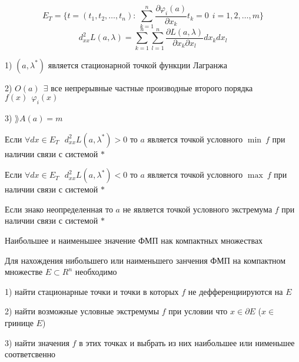 \begin{define}
  $$
  E_T = \{t = (t_1, t_2, \ldots, t_n): ~ \sum_{k=1}^n
  \frac{\partial \varphi_i(a)}{\partial x_k} t_k = 0 ~~ i = 1,2,\ldots,m\}
  $$
  $$
  d_{xx}^2 L(a, \lambda) = \sum_{k=1}^n \sum_{l=1}^n
  \frac{\partial L(a, \lambda)}{\partial x_k \partial x_l} dx_k dx_l
  $$
\end{define}

\begin{block}
  1) $(a, \lambda^*)$ является стационарной точкой функции Лагранжа

  2) $O(a) ~~ \exists$ все непрерывные частные производные второго порядка
  $f(x) ~~ \varphi_i (x)$

  3) $\rang A(a) = m$

  Если $\forall dx \in E_T ~~~ d_{xx}^2 L(a, \lambda^*) > 0$ то $a$ является
  точкой условного $\min ~ f$ при наличии связи с системой $*$

  Если $\forall dx \in E_T ~~~ d_{xx}^2 L(a, \lambda^*) < 0$ то $a$ является
  точкой условного $\max ~ f$ при наличии связи с системой $*$

  Если знако неопределенная то $a$ не является точкой условного экстремума
  $f$ при наличии связи с системой $*$
\end{block}

\begin{title}[\Large]
  Наибольшее и наименьшее значение ФМП нак компактных множествах
\end{title}

\begin{block}
  Для нахождения нибольшего или наименьшего занчения ФМП на компактном
  множестве $E \subset R^n$ необходимо

  1) найти стационарные точки и точки в которых $f$ не дефференциируются на $E$

  2) найти возможные условные экстремумы $f$ при условии что $x \in \partial E$
  ($x \in$ гринице $E$)

  3) найти значения $f$ в этих точках и выбрать из них наибольшее или нименьшее
  соответсвенно
\end{block}